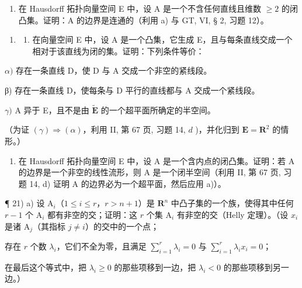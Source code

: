 \begin{enumerate}
\def\labelenumi{\alph{enumi})}
\setcounter{enumi}{1}
\tightlist
\item
  在 Hausdorff 拓扑向量空间 E 中，设 A 是一个不含任何直线且维数 \(\geqslant 2\) 的闭凸集。证明：A 的边界是连通的（利用 a) 与 GT, VI, § 2, 习题 12）。
\end{enumerate}

\begin{enumerate}
\def\labelenumi{\arabic{enumi})}
\setcounter{enumi}{19}
\tightlist
\item
  \begin{enumerate}
  \def\labelenumii{\alph{enumii})}
  \tightlist
  \item
    在向量空间 E 中，设 A 是一个凸集，它生成 E，且与每条直线交成一个相对于该直线为闭的集。证明：下列条件等价：
  \end{enumerate}
\end{enumerate}

\(\alpha)\) 存在一条直线 D，使 D 与 A 交成一个非空的紧线段。

β) 存在一条直线 D，使每条与 D 平行的直线都与 A 交成一个紧线段。

\(\gamma)\) A 异于 E，且不是由 \(\tilde{\mathbf{E}}\) 的一个超平面所确定的半空间。

（为证 \((\gamma) \Rightarrow (\alpha)\)，利用 II, 第 67 页, 习题 14, \(d\) )，并化归到 \(\mathbf{E} = \mathbf{R}^2\) 的情形。）

\begin{enumerate}
\def\labelenumi{\alph{enumi})}
\setcounter{enumi}{1}
\tightlist
\item
  在 Hausdorff 拓扑向量空间 E 中，设 A 是一个含内点的闭凸集。证明：若 A 的边界是一个非空的线性流形，则 A 是一个闭半空间（利用 II, 第 67 页, 习题 14, d) 证明 A 的边界必为一个超平面，然后应用 a)）。
\end{enumerate}

¶ 21) a) 设 \(\mathrm{A}_i\)（\(1 \leqslant i \leqslant r\)，\(r > n + 1\)）是 \(\mathbf{R}^n\) 中凸子集的一个族，使得其中任何 \(r - 1\) 个 \(\mathrm{A}_i\) 都有非空的交；证明：这 \(r\) 个集 \(\mathrm{A}_i\) 有非空的交（Helly 定理）。（设 \(x_i\) 是诸 \(\mathrm{A}_j\)（其指标 \(j \neq i\)）的交中的一个点；

存在 \(r\) 个数 \(\lambda_{i}\)，它们不全为零，且满足 \(\sum_{i=1}^{r} \lambda_{i} = 0\) 与 \(\sum_{i=1}^{r} \lambda_{i} x_{i} = 0\)；

在最后这个等式中，把 \(\lambda_{i} \geqslant 0\) 的那些项移到一边，把 \(\lambda_{i} < 0\) 的那些项移到另一边。）

